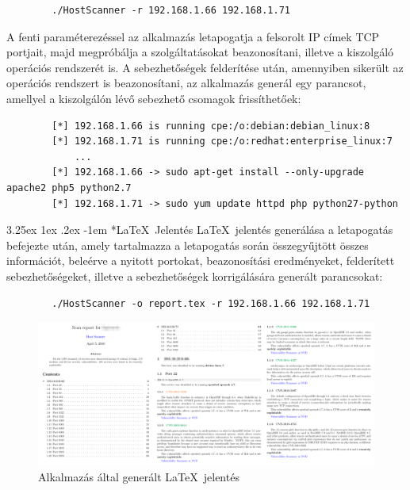 \documentclass[a4paper,12pt]{article}
\makeatletter
\renewcommand\paragraph{\@startsection{paragraph}{6}{\parindent}%
  {3.25ex \@plus1ex \@minus .2ex}%
  {-1em}%
  {\normalfont\normalsize\bfseries}}
\makeatother
\begin{document}
	\begin{listing}[H]
	\begin{verbatim}
		./HostScanner -r 192.168.1.66 192.168.1.71
	\end{verbatim}
	\end{listing}

	\vspace{-0.25in}
	A fenti paraméterezéssel az alkalmazás letapogatja a felsorolt IP címek TCP portjait, majd megpróbálja a szolgáltatásokat beazonosítani, illetve a kiszolgáló operációs rendszerét is. A sebezhetőségek felderítése után, amennyiben sikerült az operációs rendszert is beazonosítani, az alkalmazás generál egy parancsot, amellyel a kiszolgálón lévő sebezhető csomagok frissíthetőek:

	\begin{listing}[H]
	\begin{verbatim}
		[*] 192.168.1.66 is running cpe:/o:debian:debian_linux:8
		[*] 192.168.1.71 is running cpe:/o:redhat:enterprise_linux:7
		    ...
		[*] 192.168.1.66 -> sudo apt-get install --only-upgrade apache2 php5 python2.7
		[*] 192.168.1.71 -> sudo yum update httpd php python27-python
	\end{verbatim}
	\end{listing}

	\vspace{-0.5in}
	\paragraph*{\LaTeX\ Jelentés} \LaTeX\ jelentés generálása a letapogatás befejezte után, amely tartalmazza a letapogatás során összegyűjtött összes információt, beleérve a nyitott portokat, beazonosítási eredményeket, felderített sebezhetőségeket, illetve a sebezhetőségek korrigálására generált parancsokat:

	\begin{listing}[H]
	\begin{verbatim}
		./HostScanner -o report.tex -r 192.168.1.66 192.168.1.71
	\end{verbatim}
	\end{listing}

	\begin{figure}[!htbp]
		\centering
		\includegraphics[scale=0.07]{reportcap.png}
		\caption{Alkalmazás által generált \LaTeX\ jelentés}
		\label{latexrep}
	\end{figure}
\end{document}
